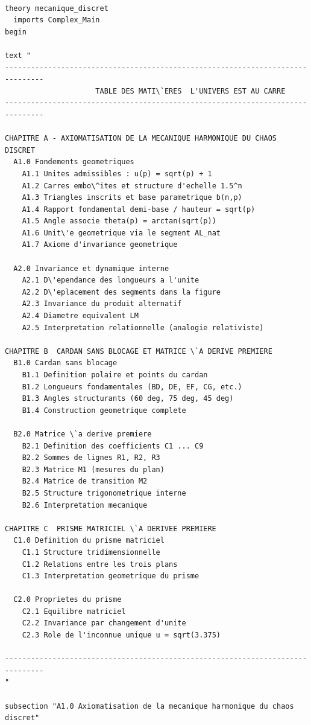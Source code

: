 \documentclass[12pt,a4paper]{article}
\begin{document}
\begin{verbatim}

theory mecanique_discret
  imports Complex_Main
begin

text "
-------------------------------------------------------------------------------
                     TABLE DES MATI\`ERES  L'UNIVERS EST AU CARRE
-------------------------------------------------------------------------------

CHAPITRE A - AXIOMATISATION DE LA MECANIQUE HARMONIQUE DU CHAOS DISCRET
  A1.0 Fondements geometriques
    A1.1 Unites admissibles : u(p) = sqrt(p) + 1
    A1.2 Carres embo\^ites et structure d'echelle 1.5^n
    A1.3 Triangles inscrits et base parametrique b(n,p)
    A1.4 Rapport fondamental demi-base / hauteur = sqrt(p)
    A1.5 Angle associe theta(p) = arctan(sqrt(p))
    A1.6 Unit\'e geometrique via le segment AL_nat
    A1.7 Axiome d'invariance geometrique

  A2.0 Invariance et dynamique interne
    A2.1 D\'ependance des longueurs a l'unite
    A2.2 D\'eplacement des segments dans la figure
    A2.3 Invariance du produit alternatif
    A2.4 Diametre equivalent LM
    A2.5 Interpretation relationnelle (analogie relativiste)

CHAPITRE B  CARDAN SANS BLOCAGE ET MATRICE \`A DERIVE PREMIERE
  B1.0 Cardan sans blocage
    B1.1 Definition polaire et points du cardan
    B1.2 Longueurs fondamentales (BD, DE, EF, CG, etc.)
    B1.3 Angles structurants (60 deg, 75 deg, 45 deg)
    B1.4 Construction geometrique complete

  B2.0 Matrice \`a derive premiere
    B2.1 Definition des coefficients C1 ... C9
    B2.2 Sommes de lignes R1, R2, R3
    B2.3 Matrice M1 (mesures du plan)
    B2.4 Matrice de transition M2
    B2.5 Structure trigonometrique interne
    B2.6 Interpretation mecanique

CHAPITRE C  PRISME MATRICIEL \`A DERIVEE PREMIERE
  C1.0 Definition du prisme matriciel
    C1.1 Structure tridimensionnelle
    C1.2 Relations entre les trois plans
    C1.3 Interpretation geometrique du prisme

  C2.0 Proprietes du prisme
    C2.1 Equilibre matriciel
    C2.2 Invariance par changement d'unite
    C2.3 Role de l'inconnue unique u = sqrt(3.375)

-------------------------------------------------------------------------------
"

subsection "A1.0 Axiomatisation de la mecanique harmonique du chaos discret"


\end{verbatim}
\end{document}
